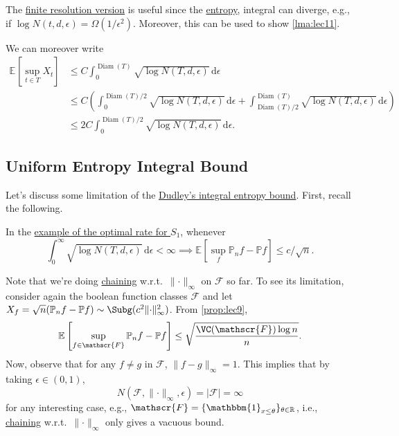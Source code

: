 The \hyperref[col:Dudley-integral-entropy-bound-finite-resolution]{finite resolution version} is useful since the \hyperref[def:metric-entropy]{entropy}, integral can diverge, e.g., if \(\log N(t, d, \epsilon ) = \Omega (1 / \epsilon ^2)\). Moreover, this can be used to show \autoref{lma:lec11}.

\begin{remark}
	We can moreover write
	\[
		\begin{split}
			\mathbb{E}_{}\left[\sup _{t\in T} X_t \right]
			&\leq C \int_{0}^{\mathop{\mathrm{Diam}}(T) } \sqrt{\log N(T, d, \epsilon )}  \,\mathrm{d}\epsilon \\
			&\leq C \left( \int_{0}^{\mathop{\mathrm{Diam}}(T) / 2} \sqrt{\log N(T, d, \epsilon )}  \,\mathrm{d}\epsilon + \int_{\mathop{\mathrm{Diam}}(T) / 2}^{\mathop{\mathrm{Diam}}(T) } \sqrt{\log N(T, d, \epsilon )} \,\mathrm{d}\epsilon \right) \\
			&\leq 2C \int_{0}^{\mathop{\mathrm{Diam}}(T) / 2} \sqrt{\log N(T, d, \epsilon )} \,\mathrm{d}\epsilon .
		\end{split}
	\]
\end{remark}

\subsection{Uniform Entropy Integral Bound}
Let's discuss some limitation of the \hyperref[col:Dudley-integral-entropy-bound]{Dudley's integral entropy bound}. First, recall the following.

\begin{prev}
	In the \hyperref[eg:optimal-EP-supremum-S1]{example of the optimal rate for \(S_1\)}, whenever
	\[
		\int_{0}^{\infty} \sqrt{\log N(T, d, \epsilon )} \,\mathrm{d}\epsilon < \infty
		\implies \mathbb{E}_{}\left[\sup _f \mathbb{P} _n f - \mathbb{P} f \right] \leq c / \sqrt{n}.
	\]
\end{prev}

Note that we're doing \hyperref[note:chaining]{chaining} w.r.t.\ \(\lVert \cdot \rVert _\infty \) on \(\mathscr{F} \) so far. To see its limitation, consider again the boolean function classes \(\mathscr{F} \) and let \(X_f = \sqrt{n} (\mathbb{P} _n f - \mathbb{P} f) \sim \Subg (c^2 \lVert \cdot \rVert ^2_\infty )\). From \autoref{prop:lec9},
\[
	\mathbb{E}_{}\left[\sup _{f\in \mathscr{F} } \mathbb{P} _n f - \mathbb{P} f \right]
	\leq \sqrt{\frac{\VC(\mathscr{F} ) \log n }{n}}.
\]
Now, observe that for any \(f \neq g\) in \(\mathscr{F} \), \(\lVert f - g \rVert _\infty = 1\). This implies that by taking \(\epsilon \in (0, 1)\),
\[
	N(\mathscr{F} , \lVert \cdot \rVert _\infty , \epsilon ) = \vert \mathscr{F} \vert = \infty
\]
for any interesting case, e.g., \(\mathscr{F} = \{ \mathbbm{1}_{x \leq \theta } \}_{\theta \in \mathbb{R}} \), i.e., \hyperref[note:chaining]{chaining} w.r.t.\ \(\lVert \cdot \rVert _\infty \) only gives a vacuous bound.

